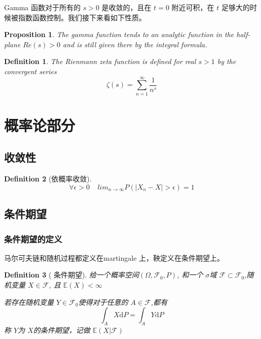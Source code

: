 \documentclass{article}
\newtheorem{definition}{Definition}
\newtheorem{proposition}{Proposition}
\begin{document}
Gamma 函数对于所有的 $ s>0 $ 是收敛的，且在 $ t=0 $ 附近可积，在 $ t $ 足够大的时候被指数函数控制。我们接下来看如下性质。
\begin{proposition}
    The gamma function tends to an analytic function in the half-plane $ Re(s)>0 $ and is still given there by the integral formula.
\end{proposition}


\begin{definition}
    The Rienmann zeta function is defined for real $ s >1$ by the convergent series \[ \zeta(s)=\sum_{n=1}^{\infty}\frac{1}{n^s} \]
\end{definition}

\newpage
\section{概率论部分}

\subsection{收敛性}
\begin{definition}[依概率收敛]
    \[ \forall \epsilon >0\ \ \ \ \ lim_{n\rightarrow \infty }P(|X_n-X|>\epsilon)=1 \]
\end{definition}




\newpage
\subsection{条件期望} 
\subsubsection{条件期望的定义}
马尔可夫链和随机过程都定义在martingale 上，鞅定义在条件期望上。



\begin{definition}[ 条件期望]
    给一个概率空间$ (\Omega, \mathcal{F}_0, P) $, 和一个 $ \sigma $域 $ \mathcal{F}\subset \mathcal{F}_0 $,随机变量 $ X \in \mathcal{F} $,  且 $ \mathbb{E}(X)<\infty $ \par
    若存在随机变量 $ Y\in \mathcal{F}_0 $使得对于任意的 $ A\in \mathcal{F} $,都有 \[ \int_{A} X \mathrm{d}P= \int_{A}Y \mathrm{d}P \]称 $ Y $为 $ X $的条件期望，记做 $ \mathbb{E}(X|\mathcal{F}) $

\end{definition}
\end{document}
